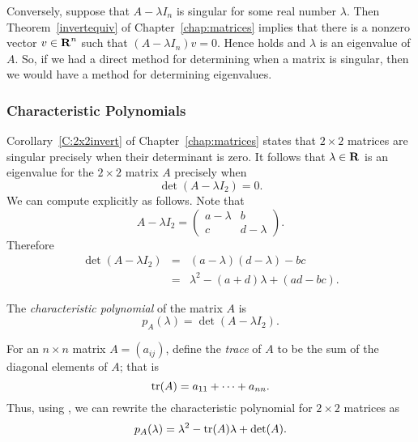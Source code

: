 \documentclass{ximera}
\begin{document}
Conversely, suppose that $A-\lambda I_n$ is singular for some
real number $\lambda$.  Then Theorem~\ref{invertequiv} of 
Chapter~\ref{chap:matrices} implies that there is a nonzero
vector $v\in\mbox{$\bf{R}$}^n$ such that $(A-\lambda I_n)v = 0$. Hence
 holds and $\lambda$ is an eigenvalue of $A$.
So, if we had a direct method for determining when a matrix
is singular, then we would have a method for determining
eigenvalues.

\subsubsection*{Characteristic Polynomials}

Corollary~\ref{C:2x2invert} of Chapter~\ref{chap:matrices}
states that $2\times 2$ matrices are singular precisely when
their determinant is zero.  It follows that $\lambda\in\mbox{$\bf{R}$}$ is
an eigenvalue for the $2\times 2$ matrix $A$ precisely when
\begin{equation} \label{deteqn}
\det(A-\lambda I_2) = 0.
\end{equation}
We can compute  explicitly as follows. Note that
\[
A-\lambda I_2 = \left(\begin{array}{cc} a-\lambda & b \\
c & d-\lambda \end{array} \right).
\]
Therefore
\begin{eqnarray}
\det(A-\lambda I_2) & = & (a-\lambda)(d-\lambda) - bc \nonumber \\
& = & \lambda^2 - (a+d)\lambda + (ad-bc). \label{e:charpoly}
\end{eqnarray}

\begin{Def} \label{charpolyn=2}
The {\em characteristic polynomial\/} of the matrix $A$ is
\[
p_A(\lambda) = \det(A-\lambda I_2).
\]
\end{Def} 

For an $n\times n$ matrix $A=(a_{ij})$, define the {\em trace\/}
 of $A$ to be the sum of the diagonal elements of $A$;
that is
\begin{equation}  \label{e:tracedef}
{\rm tr}(A) = a_{11} + \cdots + a_{nn}.
\end{equation}
Thus, using , we can rewrite the characteristic
polynomial for $2\times 2$ matrices as
\begin{equation} \label{e:invcharpoly}
p_A(\lambda)=\lambda^2 - {\rm tr}(A)\lambda + \det(A).
\end{equation}
\end{document}
